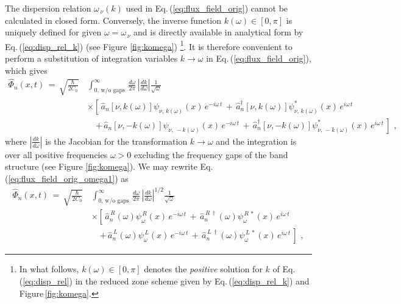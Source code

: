 The dispersion relation $\omega_{\,\nu}(k)$ used in
Eq.\,(\ref{eq:flux_field_orig}) cannot be calculated in closed form. 
Conversely, the inverse function $k(\omega) \in [0,\pi]$ is uniquely defined for given 
$\omega = \omega_{\,\nu}$ and is directly available in analytical form by Eq.\,(\ref{eq:disp_rel_k}) (see Figure \ref{fig:komega})
%
\footnote{In what follows, $k(\omega) \in [0,\pi]$ denotes the {\em positive} solution for $k$ of 
Eq.\,(\ref{eq:disp_rel}) in the reduced zone scheme given by Eq.\,(\ref{eq:disp_rel_k})
and Figure\,\ref{fig:komega}.\label{foot:k}}.
%
It is therefore convenient to perform a substitution of integration variables $k \to \omega$
in Eq.\,(\ref{eq:flux_field_orig}), which gives
%
\begin{equation} \label{eq:flux_field_orig_omega1}
\begin{split}
    \hat{\Phi}_n(x,t) \, = \, \sqrt{\frac{\hbar}{2 C_0}} \, &
    \int_{0, \, \text{w/o gaps}}^{\infty} \, \frac{d\omega}{2 \pi} \, \left| \frac{d k}{d \omega} \right|
        \frac{1}{\sqrt{\omega}} \\[2mm]
    & \times \left[ \, \hat{a}_n\left[ \nu, k(\omega) \right] \psi_{\nu, \, k(\omega)}(x) \, e^{-i \omega \, t} \, + \,
    \hat{a}_n^{\dagger}\left[ \nu, k(\omega) \right] \psi_{\nu, \, k(\omega)}^*(x) \, e^{i \omega \, t} \right. \\[2mm]
    & \quad \left. + \, \hat{a}_n\left[ \nu, -k(\omega) \right] \psi_{\nu, \, -k(\omega)}(x) \, e^{-i \omega \, t} \, + \,
    \hat{a}_n^{\dagger}\left[ \nu, -k(\omega) \right] \psi_{\nu, \, -k(\omega)}^*(x) \, e^{i \omega \, t} \, \right] \, \, ,
\end{split}
\end{equation}
%
where $\displaystyle{\left| \frac{d k}{d \omega} \right|}$ is the Jacobian 
for the transformation $k \to \omega$
and the integration is over all positive frequencies $\omega > 0$ excluding the frequency gaps 
of the band structure (see Figure \ref{fig:komega}).
We may rewrite Eq.\,(\ref{eq:flux_field_orig_omega1}) as
%
\begin{equation} \label{eq:flux_field_orig_omega2}
\begin{split}
    \hat{\Phi}_n(x,t) \, = \, \sqrt{\frac{\hbar}{2 C_0}} \, &
    \int_{0, \, \text{w/o gaps}}^{\infty} \, \frac{d\omega}{2 \pi} \, \left| \frac{d k}{d \omega} \right|^{1/2}
        \frac{1}{\sqrt{\omega}} \\[2mm]
    & \times \left[\,\hat{a}_n^{\,R}(\omega) \psi_{\omega}^{\,R}(x) \, e^{-i \omega \, t} \, + \,
    \hat{a}_n^{\,R \, \dagger}(\omega) \psi_{\omega}^{\,R \, *}(x) \, e^{i \omega \, t} \right. \\[2mm]
    & \quad \left. + \, \hat{a}_n^{\,L}(\omega) \psi_{\omega}^{\,L}(x) \, e^{-i \omega \, t} \, + \,
    \hat{a}_n^{\,L \, \dagger}(\omega) \psi_{\omega}^{\,L \, *}(x) \, e^{i \omega \, t} \, \right] \, \, ,
\end{split}
\end{equation}
